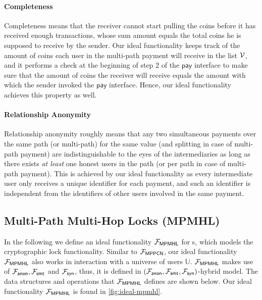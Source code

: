 
\paragraph{Completeness}
Completeness means that the receiver cannot start pulling the coins before it has received 
enough transactions, whose sum amount equals the total coins he is supposed to receive by 
the sender. Our ideal functionality keeps track of the amount of coins each user in the 
multi-path payment will receive in the list $\mathcal{V}$, and it performs a check at the beginning of 
step 2 of the $\mathsf{pay}$ interface to make sure that the amount of coins the receiver will 
receive equals the amount with which the sender invoked the $\mathsf{pay}$ interface. Hence, our 
ideal functionality achieves this property as well.

\paragraph{Relationship Anonymity}
Relationship anonymity roughly means that any two simultaneous payments over the same path (or 
multi-path) for the same value (and splitting in case of multi-path payment) are 
indistinguishable to the eyes of the intermediaries as long as there exists \emph{at least} 
one honest users in the path (or per path in case of multi-path payment). 
This is achieved by 
our ideal functionality as every intermediate user only receives a unique identifier for 
each payment, and such an identifier is independent from the identifiers of other users involved 
in the same payment.

\subsection{Multi-Path Multi-Hop Locks (MPMHL)}
\label{sec:mpmhl}

In the following we define an ideal functionality $\mathcal{F}_{\mathsf{MPMHL}}$ for {\sysname}s, which 
models the cryptographic lock functionality. Similar to $\mathcal{F}_{\mathsf{MPPCN}}$, our ideal 
functionality $\mathcal{F}_{\mathsf{MPMHL}}$ also works in interaction with a universe of users 
$\mathbb{U}$.
$\mathcal{F}_{\mathsf{MPMHL}}$ makes use of $\mathcal{F}_{\mathsf{anon}}, \mathcal{F}_{\mathsf{smt}}$ and $\mathcal{F}_{\mathsf{syn}}$, thus, it is 
defined in $(\mathcal{F}_{\mathsf{anon}}, \mathcal{F}_{\mathsf{smt}}, \mathcal{F}_{\mathsf{syn}})$-hybrid model. The data structures and 
operations that $\mathcal{F}_{\mathsf{MPMHL}}$ defines are shown below. Our ideal functionality 
$\mathcal{F}_{\mathsf{MPMHL}}$ is found in \cref{fig:ideal-mpmhl}.

